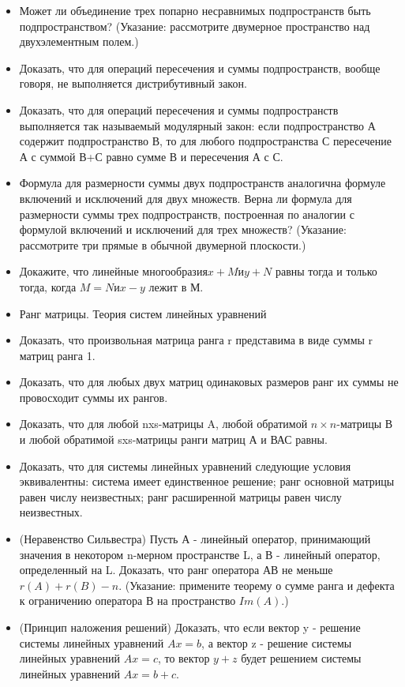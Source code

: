 \documentclass[a4paper]{article}
\begin{document}
\begin{itemize}
\item Может ли объединение трех попарно несравнимых подпространств быть подпространством? (Указание: рассмотрите двумерное пространство над двухэлементным полем.)
\item Доказать, что для операций пересечения и суммы подпространств, вообще говоря, не выполняется дистрибутивный закон.
\item Доказать, что для операций пересечения и суммы подпространств выполняется так называемый модулярный закон: если подпространство А содержит подпространство В, то для любого подпространства С пересечение А с суммой В+С равно сумме В и пересечения А с С.
\item Формула для размерности суммы двух подпространств аналогична формуле включений и исключений для двух множеств. Верна ли формула для размерности суммы трех подпространств, построенная по аналогии с формулой включений и исключений для трех множеств? (Указание: рассмотрите три прямые в обычной двумерной плоскости.)
\item Докажите, что линейные многообразия$ x+M и y+N$ равны тогда и только тогда, когда $M = N и x-y$ лежит в М.
\item Ранг матрицы. Теория систем линейных уравнений
\item Доказать, что произвольная матрица ранга r представима в виде суммы r матриц ранга 1.
\item Доказать, что для любых двух матриц одинаковых размеров ранг их суммы не провосходит суммы их рангов.
\item Доказать, что для любой nxs-матрицы A, любой обратимой $n \times n$-матрицы В и любой обратимой sxs-матрицы ранги матриц А и ВАС равны.
\item Доказать, что для системы линейных уравнений следующие условия эквивалентны:
система имеет единственное решение;
ранг основной матрицы равен числу неизвестных;
ранг расширенной матрицы равен числу неизвестных.
\item (Неравенство Сильвестра) Пусть А - линейный оператор, принимающий значения в некотором n-мерном пространстве L, а В - линейный оператор, определенный на L. Доказать, что ранг оператора АВ не меньше $r(A)+r(B)-n$. (Указание: примените теорему о сумме ранга и дефекта к ограничению оператора В на пространство $Im(A)$.)
\item (Принцип наложения решений) Доказать, что если вектор y - решение системы линейных уравнений $Ax=b$, а вектор z - решение системы линейных уравнений $Ax=c$, то вектор $y+z$ будет решением системы линейных уравнений $Ax=b+c$.

\end{itemize}
\end{document}
